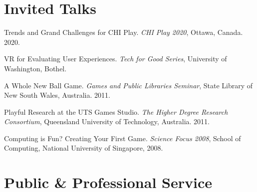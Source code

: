 \documentclass[10pt,a4paper]{article}
\renewenvironment{itemize}{
    \begin{list}{}{
            \setlength{\leftmargin}{1.5em}
            \setlength{\itemsep}{0.25em}
            \setlength{\parskip}{0pt}
            \setlength{\parsep}{0.25em}
        }
        }{
    \end{list}
}
\begin{document}
\nocite{*}


\printbibliography[type=inproceedings,heading=subbibliography,title={Peer-reviewed Conference Papers}]
\printbibliography[type=article,heading=subbibliography,title={Peer-reviewed Journal Articles}]
\printbibliography[filter=book,heading=subbibliography,title={Book Chapters}]
\printbibliography[type=misc,heading=subbibliography,title={Edited Proceedings}]



\section*{Invited Talks}

\begin{itemize}

    \item Trends and Grand Challenges for CHI Play.
        \textit{CHI Play 2020}, Ottawa, Canada.
        2020.

    \item VR for Evaluating User Experiences.
        \textit{Tech for Good Series}, University of Washington, Bothel. 

    \item A Whole New Ball Game.
        \textit{Games and Public Libraries Seminar}, State Library of New South Wales, Australia.
        2011.

    \item Playful Research at the UTS Games Studio.
        \textit{The Higher Degree Research Consortium}, Queensland University of Technology, Australia.
        2011.

    \item Computing is Fun? Creating Your First Game.
        \textit{Science Focus 2008}, School of Computing, National University of Singapore,
        2008.

\end{itemize}



\section*{Public \& Professional Service}
\end{document}
